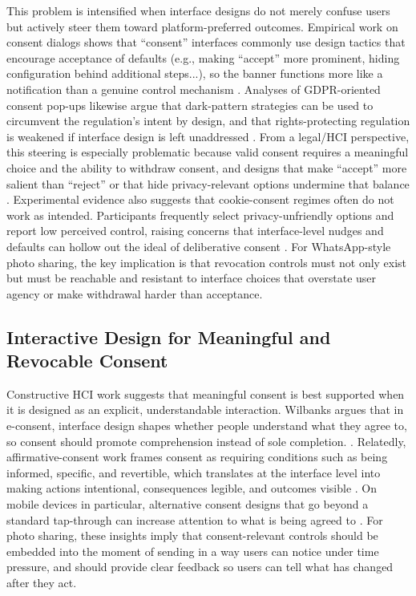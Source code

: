 This problem is intensified when interface designs do not merely confuse users but actively steer them toward platform-preferred outcomes. Empirical work on consent dialogs shows that “consent” interfaces commonly use design tactics that encourage acceptance of defaults (e.g., making ``accept'' more prominent, hiding configuration behind additional steps...), so the banner functions more like a notification than a genuine control mechanism \cite{bermejo_fernandez_2021}. Analyses of GDPR-oriented consent pop-ups likewise argue that dark-pattern strategies can be used to circumvent the regulation’s intent by design, and that rights-protecting regulation is weakened if interface design is left unaddressed \cite{soe_2020}. From a legal/HCI perspective, this steering is especially problematic because valid consent requires a meaningful choice and the ability to withdraw consent, and designs that make ``accept'' more salient than ``reject'' or that hide privacy-relevant options undermine that balance \cite{gray_etal_2021}. Experimental evidence also suggests that cookie-consent regimes often do not work as intended. Participants frequently select privacy-unfriendly options and report low perceived control, raising concerns that interface-level nudges and defaults can hollow out the ideal of deliberative consent \cite{grasl_dark}. For WhatsApp-style photo sharing, the key implication is that revocation controls must not only exist but must be reachable and resistant to interface choices that overstate user agency or make withdrawal harder than acceptance.

\subsection{Interactive Design for Meaningful and Revocable Consent}
Constructive HCI work suggests that meaningful consent is best supported when it is designed as an explicit, understandable interaction. Wilbanks argues that in e-consent, interface design shapes whether people understand what they agree to, so consent should promote comprehension instead of sole completion. \cite{wilbanks_design_2018}. Relatedly, affirmative-consent work frames consent as requiring conditions such as being informed, specific, and revertible, which translates at the interface level into making actions intentional, consequences legible, and outcomes visible \cite{im_yes_2021}. On mobile devices in particular, alternative consent designs that go beyond a standard tap-through can increase attention to what is being agreed to \cite{lindegren_evaluation_2021}. For photo sharing, these insights imply that consent-relevant controls should be embedded into the moment of sending in a way users can notice under time pressure, and should provide clear feedback so users can tell what has changed after they act.

